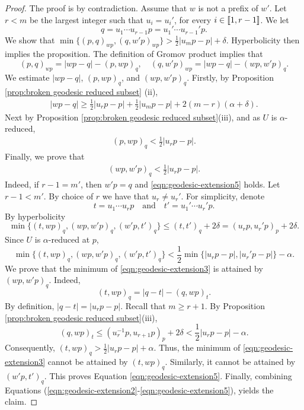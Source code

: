 \documentclass[leqno,a4paper,10pt]{amsart}
\theoremstyle{plain}
\theoremstyle{definition}
\theoremstyle{remark}
\let\le\leqslant
\let\ge\geqslant
\newcommand{\zinterval}[2]{
	\mathchoice%
	{\left \llbracket #1, \cdots, #2 \right \rrbracket}%
	{\llbracket #1, #2 \rrbracket}%
	{\llbracket #1, #2 \rrbracket}%
	{\llbracket #1, #2 \rrbracket}%
}
\begin{document}
\begin{proof}
	The proof is by contradiction.  Assume that $w$ is not a prefix of $w'$. Let $r<m$ be the largest integer such that $u_i=u_i'$, for every $i\in\zinterval{1}{r-1}$. We let 
	$$q=u_1\cdots u_{r-1}p=u_1'\cdots u_{r-1}'p.$$ 
	We show that $\min\{(p,q)_{wp},(q,w'p)_{wp}\}> \frac{1}{2}|u_mp-p|+\delta.$ Hyperbolicity then implies the proposition. 
	The definition of Gromov product implies that 
	\begin{equation}
		\label{eqn:geodesic-extension2}	
		(p,q)_{wp}=|wp-q|-(p,wp)_q,\quad (q,w'p)_{wp}=|wp-q|-(wp,w'p)_q.
	\end{equation}
	We estimate $|wp-q|$, $(p,wp)_q$, and $(wp,w'p)_q$. Firstly, by Proposition \ref{prop:broken geodesic reduced subset} (ii),   
	\begin{align}
		|wp-q|\ge \frac{1}{2}|u_rp-p|+\frac{1}{2}|u_mp-p|+2(m-r)(\alpha+\delta).\label{cla:geodesic-extension}
	\end{align}
Next by Proposition \ref{prop:broken geodesic reduced subset}(iii), and as $U$ is $\alpha$-reduced,
	\begin{align}
		(p,wp)_q<\frac{1}{2}|u_rp-p|. \label{eqn:geodesic-extension4} 
	\end{align}
Finally, we prove that 
	\begin{align}
		(wp,w'p)_q<\frac{1}{2}|u_rp-p|. \label{eqn:geodesic-extension5} 
	\end{align}
		Indeed, if $r-1=m'$, then $w'p = q$ and \eqref{eqn:geodesic-extension5} holds. Let $r-1<m'$. By choice of $r$ we have that $u_r\neq u_r'$. 
		For simplicity, denote
	$$t=u_1\cdots u_{r}p\quad\text{and}\quad t'=u_1'\cdots u_{r}'p.$$ 
	By hyperbolicity 
		$$\min\{(t,wp)_q,(wp,w'p)_q,(w'p,t')_q\}\le (t,t')_q+2\delta=(u_rp,u_r'p)_p+2\delta.$$
		Since $U$ is $\alpha$-reduced at $p$,
				\begin{equation}
			\label{eqn:geodesic-extension3}
			\min\{(t,wp)_q,(wp,w'p)_q,(w'p,t')_q\}< \frac{1}{2}\min\{|u_rp-p|,|u_r'p-p|\}-\alpha.
		\end{equation}
		We prove that the minimum of \eqref{eqn:geodesic-extension3} is attained by $(wp,w'p)_q$. Indeed,  
		$$(t,wp)_q=|q-t|-(q,wp)_t.$$
		By definition, $|q-t|=|u_rp-p|.$ Recall that $m\ge r+1$. By Proposition \ref{prop:broken geodesic reduced subset}(iii), 
		$$(q,wp)_t\le (u_r^{-1}p,u_{r+1}p)_p+2\delta<\frac{1}{2}|u_rp-p|-\alpha.$$
				Consequently,
		 $(t,wp)_q > \frac{1}{2}|u_rp-p|+\alpha.$ 
		Thus, the minimum of \eqref{eqn:geodesic-extension3} cannot be attained by $(t,wp)_q$. Similarly, it cannot be attained by $(w'p,t')_q$. This proves Equation \eqref{eqn:geodesic-extension5}. 
	Finally, combining Equations (\ref{eqn:geodesic-extension2}-\ref{eqn:geodesic-extension5}), yields the claim. 
	\end{proof}
	
\end{document}
